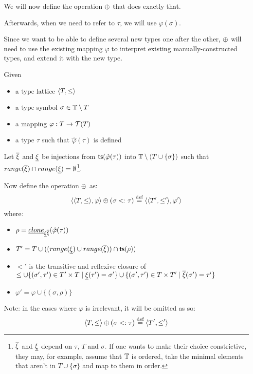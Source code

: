 \documentclass[main.tex]{subfiles}
\begin{document}
We will now define the operation $\oplus$ that does exactly that.

Afterwards, when we need to refer to $\tau$, we will use $\varphi(\sigma)$.

Since we want to be able to define several new types one after the other,
$\oplus$ will need to use the existing mapping $\varphi$ to interpret
existing manually-constructed types, and extend it with the new type.
\begin{defn}
    \label{def:subadd}
    Given
    \begin{itemize}
        \item a type lattice $\langle  T,  \leq  \rangle$
        \item a type symbol $\sigma \in \mathbb{T} \setminus T$
        \item a mapping $\varphi : T \rightarrow \mathcal{T}( T )$
        \item a type $\tau$ such that $\hat{\varphi}(\tau)$ is defined
    \end{itemize}
    Let $\overline{\xi}$ and $\underline{\xi}$ be injections from
    $\mathsf{ts}(\hat{\varphi}(\tau))$ into $\mathbb{T} \setminus (T \cup \{ \sigma \})$ such that
    $range(\overline{\xi}) \cap range(\underline{\xi}) = \emptyset$\footnote{
        $\overline{\xi}$ and $\underline{\xi}$ depend on $\tau$, $T$ and
        $\sigma$. If one wants to make their choice constrictive, they may,
        for example, assume that $\mathbb{T}$ is ordered, take the minimal
        elements that aren't in $T \cup \{ \sigma \}$ and map to them in
        order.
    }.

    Now define the operation $\oplus$ as:
        \[ \langle \langle  T,  \leq  \rangle, \varphi \rangle
            \oplus (\sigma <: \tau)
            \overset{\text{\scriptsize def}}{=}
            \langle \langle  T',  \leq'  \rangle, \varphi' \rangle
        \] where:
    \begin{itemize}
        \item $\rho = \underline{clone}_{\underline{\xi} \overline{\xi}}(\hat{\varphi}(\tau))$
        \item $T' = T \cup ((range(\underline{\xi}) \cup range(\overline{\xi})) \cap \mathsf{ts}(\rho))$
        \item $\less'$ is the transitive and reflexive closure of
            $\leq \cup \{ (\sigma', \tau') \in T' \times T \mid \underline{\xi}(\tau') = \sigma' \}
                   \cup \{ (\sigma', \tau') \in T \times T' \mid \overline{\xi}(\sigma') = \tau' \}$
        \item $\varphi' = \varphi \cup \{ (\sigma, \rho) \}$
    \end{itemize}

    Note: in the cases where $\varphi$ is irrelevant, it will be omitted as
    so:
    \[ \langle  T,  \leq  \rangle
        \oplus (\sigma <: \tau)
        \overset{\text{\scriptsize def}}{=}
        \langle  T',  \leq'  \rangle
    \]
\end{defn}
\end{document}
